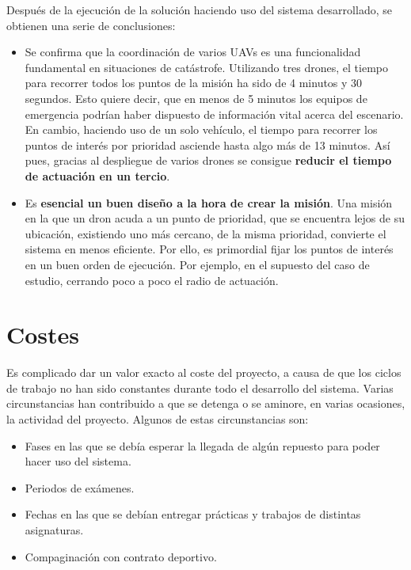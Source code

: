 Después de la ejecución de la solución haciendo uso del sistema desarrollado, se obtienen una serie de conclusiones:

\begin{itemize}
\item Se confirma que la coordinación de varios \acs{UAV}s es una funcionalidad fundamental en situaciones de catástrofe. Utilizando tres drones, el tiempo para recorrer todos los puntos de la misión ha sido de 4 minutos y 30 segundos. Esto quiere decir, que en menos de 5 minutos los equipos de emergencia podrían haber dispuesto de información vital acerca del escenario. En cambio, haciendo uso de un solo vehículo, el tiempo para recorrer los puntos de interés por prioridad asciende hasta algo más de 13 minutos. Así pues, gracias al despliegue de varios drones se consigue \textbf{reducir el tiempo de actuación en un tercio}.
\item Es \textbf{esencial un buen diseño a la hora de crear la misión}. Una misión en la que un dron acuda a un punto de prioridad, que se encuentra lejos de su ubicación, existiendo uno más cercano, de la misma prioridad, convierte el sistema en menos eficiente. Por ello, es primordial fijar los puntos de interés en un buen orden de ejecución. Por ejemplo, en el supuesto del caso de estudio, cerrando poco a poco el radio de actuación.
\end{itemize}

\section{Costes}

Es complicado dar un valor exacto al coste del proyecto, a causa de que los ciclos de trabajo no han sido constantes durante todo el desarrollo del sistema. Varias circunstancias han contribuido a que se detenga o se aminore, en varias ocasiones, la actividad del proyecto. Algunos de estas circunstancias son:

\begin{itemize}
\item Fases en las que se debía esperar la llegada de algún repuesto para poder hacer uso del sistema.
\item Periodos de exámenes.
\item Fechas en las que se debían entregar prácticas y trabajos de distintas asignaturas.
\item Compaginación con contrato deportivo.
\end{itemize}  


